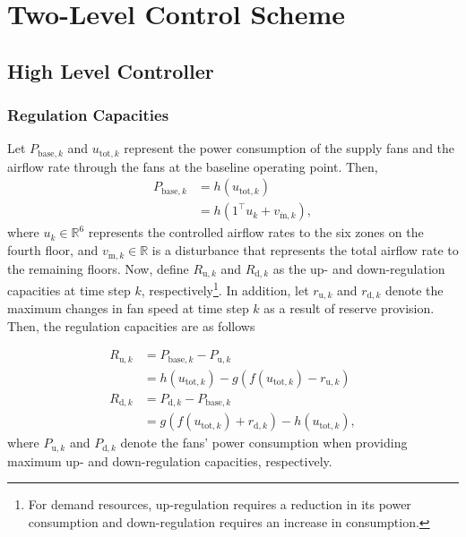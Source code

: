 %
%


\section{Two-Level Control Scheme}\label{sec:control}


\subsection{High Level Controller}\label{sec:hlc}
\subsubsection{Regulation Capacities}

Let $P_{\text{base},k}$ and $u_{\text{tot},k}$ represent the power consumption of the supply fans and the airflow rate through the fans at the baseline operating point. Then,
\begin{equation}\label{eq:P}
\begin{aligned}
P_{\text{base},k} &= h(u_{\text{tot},k})\\
&=h(1^\top u_k + v_{\dot{\text{m}},k}),
\end{aligned}
\end{equation}
where $u_k \in \mathbb{R}^6$ represents the controlled airflow rates to the six zones on the fourth floor, and $v_{\dot{\text{m}},k} \in \mathbb{R}$ is a disturbance that represents the total airflow rate to the remaining floors.
Now, define $R_{\text{u},k}$ and $R_{\text{d},k}$ as the up- and down-regulation capacities at time step $k$, respectively\footnote{For demand resources, up-regulation requires a reduction in its power consumption and down-regulation requires an increase in consumption.}. In addition, let $r_{\text{u},k}$ and $r_{\text{d},k}$ denote the maximum changes in fan speed at time step $k$ as a result of reserve provision. Then, the regulation capacities are as follows

\begin{equation}\label{eq:Ru_Rd}
\begin{aligned}
R_{\text{u},k} & = P_{\text{base},k} - P_{\text{u},k}\\
 & = h(u_{\text{tot},k}) - g(f(u_{\text{tot},k}) - r_{\text{u},k})\\
R_{\text{d},k} & = P_{\text{d},k} - P_{\text{base},k}\\
 & = g(f(u_{\text{tot},k}) + r_{\text{d},k}) - h(u_{\text{tot},k}),
\end{aligned}
\end{equation}
\noindent
where $P_{\text{u},k}$ and $P_{\text{d},k}$ denote the fans' power consumption when providing maximum up- and down-regulation capacities, respectively.

